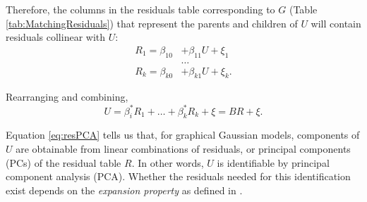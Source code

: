 \documentclass[letterpaper]{article}
\begin{document}
\begin{center}
\begin{table}[ht]
\centering
{}
\qquad
\qquad
\qquad
\qquad
{}
\caption{The training data frame (Variables) implies a matching data frame (Residuals) once the joint distribution of all variables is specified via a graph and its parameterization}
\label{tab:MatchingResiduals}
\end{table}
\end{center}

Therefore, the columns in the residuals table corresponding to $G$ (Table \ref{tab:MatchingResiduals}) that represent the parents and children of $U$ will contain residuals collinear with $U$:
\begin{equation}
\begin{split}
R_1 = \beta_{10} &+ \beta_{11} U + \xi_1\\
& \hdots\\
R_k = \beta_{k0} &+ \beta_{k1} U + \xi_k.
\end{split}
\end{equation}

Rearranging and combining,
\begin{equation}
U = \beta_i^{*} R_1 + \dots + \beta_k^{*} R_k + \xi = B R + \xi.
\label{eq:resPCA}
\end{equation}

Equation \ref{eq:resPCA} tells us that, for graphical Gaussian models, components of $U$ are obtainable from linear combinations of residuals, or principal components (PCs) of the residual table $R$.  In other words, $U$ is identifiable by principal component analysis (PCA).  Whether the residuals needed for this identification exist depends on the \textit{expansion property} as defined in \cite{anandkumar_learning_2013}.
\end{document}
